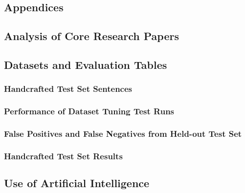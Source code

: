 \appendix

\begin{appendices}
\chapter*{Appendices}

\renewcommand{\thesection}{\Alph{section}}

\section{Analysis of Core Research Papers}\label{appendix:analysis_papers}


\section{Datasets and Evaluation Tables}\label{appendix:datasets}

\subsection{Handcrafted Test Set Sentences}
\label{tab:handcrafted_testset}


\subsection{Performance of Dataset Tuning Test Runs}
\label{appendix:dataset_tuning_table}


\subsection{False Positives and False Negatives from Held-out Test Set}
\label{tab:fp_fn_table}


\subsection{Handcrafted Test Set Results}
\label{tab:handcrafted_testset_results}



\section{Use of Artificial Intelligence}\label{appendix:artificial_intelligece}


\end{appendices}
